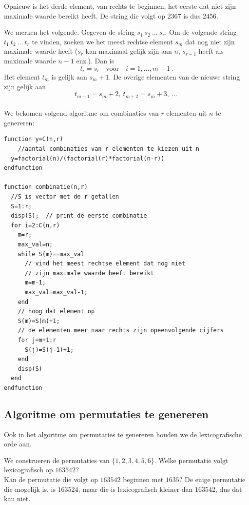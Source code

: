 Opnieuw is het derde element, van rechts te beginnen, het eerste dat niet zijn maximale waarde bereikt heeft. De string die volgt op $2367$ is dus $2456$.


We merken het volgende. Gegeven de string $s_1~s_2~\dots~s_r$. Om de volgende string $t_1~t_2~\dots~t_r$ te vinden, zoeken we het meest rechtse element $s_m$ dat nog niet zijn maximale waarde heeft ($s_r$ kan maximaal gelijk zijn aan $n$, $s_{r-1}$ heeft als maximale waarde $n-1$ enz.). Dan is
\[
t_i=s_i \quad \mathrm{voor} \quad i=1,\dots, m-1\,.
\]
Het element $t_m$ is gelijk aan $s_m+1$. De overige elementen van de nieuwe string zijn gelijk aan
\[
t_{m+1}=s_m+2,~t_{m+2}=s_m+3,~\dots\ 
\]\\

We bekomen volgend algoritme om combinaties van $r$ elementen uit $n$ te genereren:

\begin{lstlisting}[caption={Algoritme om alle combinaties van $r$ elementen uit $n$ elementen te genereren}, label={lst:alg_comb}]
function y=C(n,r)
    //aantal combinaties van r elementen te kiezen uit n
  y=factorial(n)/(factorial(r)*factorial(n-r))
endfunction

function combinatie(n,r)
  //S is vector met de r getallen
  S=1:r;
  disp(S);  // print de eerste combinatie
  for i=2:C(n,r)
    m=r;
    max_val=n;
    while S(m)==max_val
      // vind het meest rechtse element dat nog niet 
      // zijn maximale waarde heeft bereikt
      m=m-1;
      max_val=max_val-1;
    end
    // hoog dat element op
    S(m)=S(m)+1;
    // de elementen meer naar rechts zijn opeenvolgende cijfers
    for j=m+1:r
      S(j)=S(j-1)+1;
    end
    disp(S)
  end
endfunction
\end{lstlisting}

\subsection{Algoritme om permutaties te genereren}
Ook in het algoritme om permutaties te genereren houden we de lexicografische orde aan.

\voorbeeld
We construeren de permutaties van $\{1,2,3,4,5,6\}$. Welke permutatie volgt lexicografisch op $163542$?\\

Kan de permutatie die volgt op $163542$ beginnen met $1635$? De enige permutatie die mogelijk is, is $163524$, maar die is lexicografisch kleiner dan $163542$, dus dat kan niet.

